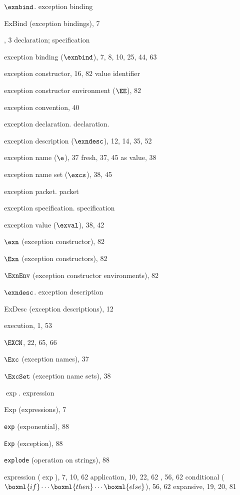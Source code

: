 \begin{theindex}
\item $\exnbind$. \see exception binding
\item ExBind (exception bindings), 7
\item \EXCEPTION, 3
\subitem \seealso declaration; specification
\item exception binding ($\exnbind$), 7, 8, 10, 25, 44, 63
\item exception constructor, 16, 82
\subitem \seealso value identifier
\item exception constructor environment ($\EE$), 82 
\item exception convention, 40
\item exception declaration. \see declaration.
\item exception description ($\exndesc$), 12, 14, 35, 52
\item exception name ($\e$), 37
\subitem fresh, 37, 45
\subitem as value, 38
\item exception name set ($\excs$), 38, 45
\item exception packet. \see packet 
\item exception specification. \see specification
\item exception value ($\exval$), 38, 42
\item $\exn$ (exception constructor), 82
\item $\Exn$ (exception constructors), 82
\item $\ExnEnv$ (exception constructor environments), 82
\item $\exndesc$. \see exception description
\item ExDesc (exception descriptions), 12
\item execution, 1, 53
\item $\EXCN$, 22, 65, 66
\item $\Exc$ (exception names), 37
\item $\ExcSet$ (exception name sets), 38
\item $\exp$. \see expression
\item Exp (expressions), 7
\item {\tt exp} (exponential), 88
\item {\tt Exp} (exception), 88
\item {\tt explode} (operation on strings), 88
\item expression ($\exp$), 7, 10, 62
\subitem application, 10, 22, 62
\subitem {}, 56, 62
\subitem conditional ($\boxml{if}\cdots\boxml{then}\cdots\boxml{else}$), 56, 62
\subitem expansive, 19, 20, 81

\end{theindex}
